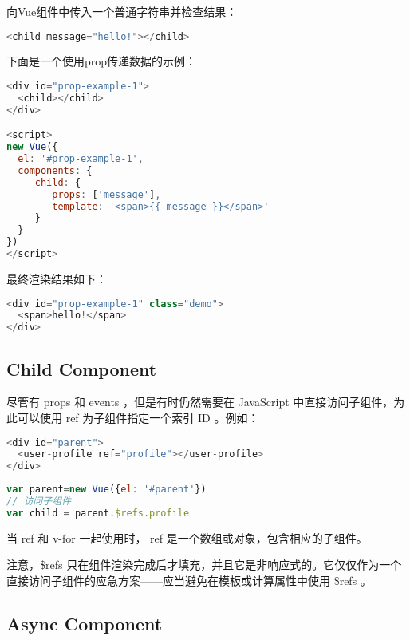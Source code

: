 向Vue组件中传入一个普通字符串并检查结果：


\begin{lstlisting}[language=JavaScript]
<child message="hello!"></child>
\end{lstlisting}

下面是一个使用prop传递数据的示例：

\begin{lstlisting}[language=JavaScript]
<div id="prop-example-1">
  <child></child>
</div>

<script>
new Vue({
  el: '#prop-example-1',
  components: {
     child: {
        props: ['message'],
        template: '<span>{{ message }}</span>'
     }
  }
})
</script>
\end{lstlisting}



最终渲染结果如下：


\begin{lstlisting}[language=JavaScript]
<div id="prop-example-1" class="demo">
  <span>hello!</span>
</div>
\end{lstlisting}


\subsection{Child Component}

尽管有 props 和 events ，但是有时仍然需要在 JavaScript 中直接访问子组件，为此可以使用 ref 为子组件指定一个索引 ID 。例如：





\begin{lstlisting}[language=JavaScript]
<div id="parent">
  <user-profile ref="profile"></user-profile>
</div>
\end{lstlisting}



\begin{lstlisting}[language=JavaScript]
var parent=new Vue({el: '#parent'})
// 访问子组件
var child = parent.$refs.profile
\end{lstlisting}

当 ref 和 v-for 一起使用时， ref 是一个数组或对象，包含相应的子组件。

注意，\$refs 只在组件渲染完成后才填充，并且它是非响应式的。它仅仅作为一个直接访问子组件的应急方案——应当避免在模板或计算属性中使用 \$refs 。


\subsection{Async Component}


